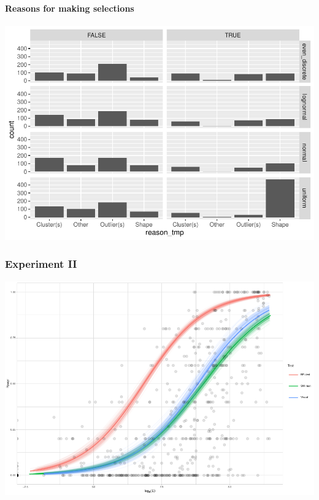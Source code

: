 \documentclass[]{interact}
\theoremstyle{plain}%
\theoremstyle{definition}
\theoremstyle{remark}
\begin{document}
\hypertarget{reasons-for-making-selections}{%
\paragraph{Reasons for making
selections}\label{reasons-for-making-selections}}

\includegraphics{paper_comparison_files/figure-latex/unnamed-chunk-13-1.pdf}

\hypertarget{experiment-ii}{%
\subsubsection{Experiment II}\label{experiment-ii}}

\includegraphics{paper_comparison_files/figure-latex/unnamed-chunk-16-1.pdf}
\end{document}
